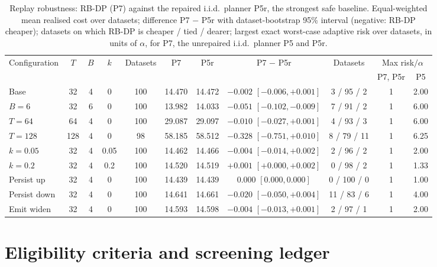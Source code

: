 \documentclass{article}
\theoremstyle{plain}
\theoremstyle{definition}
\theoremstyle{remark}
\begin{document}
\begin{table}[h]
\centering
\caption{Replay robustness: RB-DP (P7) against the repaired i.i.d.\ planner P5r, the strongest safe baseline. Equal-weighted mean realised cost over datasets; difference P7 $-$ P5r with dataset-bootstrap 95\% interval (negative: RB-DP cheaper); datasets on which RB-DP is cheaper / tied / dearer; largest exact worst-case adaptive risk over datasets, in units of $\alpha$, for P7, the unrepaired i.i.d.\ planner P5 and P5r.}
\label{tab:robust}
\small
\begin{tabular}{lcccccccccc}
\toprule
Configuration & $T$ & $B$ & $k$ & Datasets & P7 & P5r & P7 $-$ P5r & Datasets & \multicolumn{2}{c}{Max risk$/\alpha$}\\
 & & & & & & & & & P7, P5r & P5\\
\midrule
Base & 32 & 4 & 0 & 100 & 14.470 & 14.472 & $-0.002$ $[-0.006,+0.001]$ & 3 / 95 / 2 & 1 & 2.00\\
$B=6$ & 32 & 6 & 0 & 100 & 13.982 & 14.033 & $-0.051$ $[-0.102,-0.009]$ & 7 / 91 / 2 & 1 & 6.00\\
$T=64$ & 64 & 4 & 0 & 100 & 29.087 & 29.097 & $-0.010$ $[-0.027,+0.001]$ & 4 / 93 / 3 & 1 & 6.00\\
$T=128$ & 128 & 4 & 0 & 98 & 58.185 & 58.512 & $-0.328$ $[-0.751,+0.010]$ & 8 / 79 / 11 & 1 & 6.25\\
$k=0.05$ & 32 & 4 & 0.05 & 100 & 14.462 & 14.466 & $-0.004$ $[-0.014,+0.002]$ & 2 / 96 / 2 & 1 & 2.00\\
$k=0.2$ & 32 & 4 & 0.2 & 100 & 14.520 & 14.519 & $+0.001$ $[+0.000,+0.002]$ & 0 / 98 / 2 & 1 & 1.33\\
Persist up & 32 & 4 & 0 & 100 & 14.439 & 14.439 & $0.000$ $[0.000,0.000]$ & 0 / 100 / 0 & 1 & 1.00\\
Persist down & 32 & 4 & 0 & 100 & 14.641 & 14.661 & $-0.020$ $[-0.050,+0.004]$ & 11 / 83 / 6 & 1 & 4.00\\
Emit widen & 32 & 4 & 0 & 100 & 14.593 & 14.598 & $-0.004$ $[-0.013,+0.001]$ & 2 / 97 / 1 & 1 & 2.00\\
\bottomrule
\end{tabular}
\end{table}

\section{Eligibility criteria and screening ledger}
\label{app:protocol}
\end{document}
